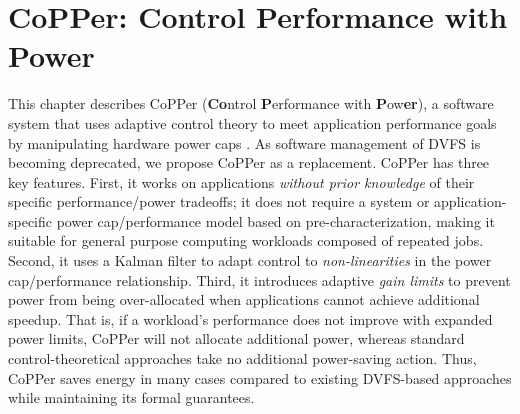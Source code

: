 \chapter{CoPPer: Control Performance with Power}
\label{sec:copper}

This chapter describes CoPPer (\textbf{Co}ntrol \textbf{P}erf\-ormance with \textbf{P}ow\textbf{er}), a software system that uses adaptive control theory to meet application performance goals by manipulating hardware power caps \cite{CopperTR}.
As software management of DVFS is becoming deprecated, we propose CoPPer as a replacement.
CoPPer has three key features.
First, it works on applications \emph{without prior knowledge} of their specific performance/power tradeoffs; \ie it does not require a system or application-specific power cap/performance model based on pre-characterization, making it suitable for general purpose computing workloads composed of repeated jobs.
Second, it uses a Kalman filter to adapt control to \emph{non-linearities} in the power cap/performance relationship.
Third, it introduces adaptive \emph{gain limits} to prevent power from being over-allocated when applications cannot achieve additional speedup.
That is, if a workload's performance does not improve with expanded power limits, CoPPer will not allocate additional power, whereas standard control-theoretical approaches take no additional power-saving action.
Thus, CoPPer saves energy in many cases compared to existing DVFS-based approaches while maintaining its formal guarantees.






